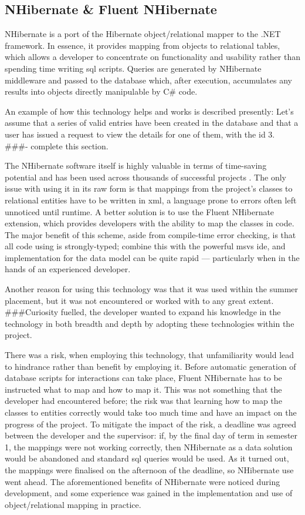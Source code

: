 \documentclass{l4proj}
\newcommand{\revisit}{\#\#\#}
\begin{document}
\subsection{NHibernate \& Fluent NHibernate}
\label{nhibernate}
NHibernate is a port of the Hibernate object/relational mapper to the .NET framework. In essence, it provides mapping from objects to relational tables, which allows a developer to concentrate on functionality and usability rather than spending time writing \gls{sql} scripts. Queries are generated by NHibernate middleware and passed to the database which, after execution, accumulates any results into objects directly manipulable by C\# code. 

An example of how this technology helps and works is described presently: Let's assume that a series of valid entries have been created in the database and that a user has issued a request to view the details for one of them, with the \gls{id} 3. \revisit - complete this section.


The NHibernate software itself is highly valuable in terms of time-saving potential and has been used across thousands of successful projects \cite{NhUse}.  The only issue with using it in its raw form is that mappings from the project's classes to relational entities have to be written in \gls{xml}, a language prone to errors often left unnoticed until runtime.  A better solution is to use the Fluent NHibernate extension, which provides developers with the ability to map the classes in code.  The major benefit of this scheme, aside from compile-time error checking, is that all code using is strongly-typed; combine this with the powerful \gls{msvs} \gls{ide}, and implementation for the data model can be quite rapid --- particularly when in the hands of an experienced developer.

Another reason for using this technology was that it was used within the summer placement, but it was not encountered or worked with to any great extent.  \revisit Curiosity fuelled, the developer wanted to expand his knowledge in the technology in both breadth and depth by adopting these technologies within the project.

There was a risk, when employing this technology, that unfamiliarity would lead to hindrance rather than benefit by employing it.  Before automatic generation of database scripts for interactions can take place, Fluent NHibernate has to be instructed what to map and how to map it.  This was not something that the developer had encountered before; the risk was that learning how to map the classes to entities correctly would take too much time and have an impact on the progress of the project.  To mitigate the impact of the risk, a deadline was agreed between the developer and the supervisor: if, by the final day of term in semester 1, the mappings were not working correctly, then NHibernate as a data solution would be abandoned and standard \gls{sql} queries would be used.  As it turned out, the mappings were finalised on the afternoon of the deadline, so NHibernate use went ahead.  The aforementioned benefits of NHibernate were noticed during development, and some experience was gained in the implementation and use of object/relational mapping in practice.
\end{document}
